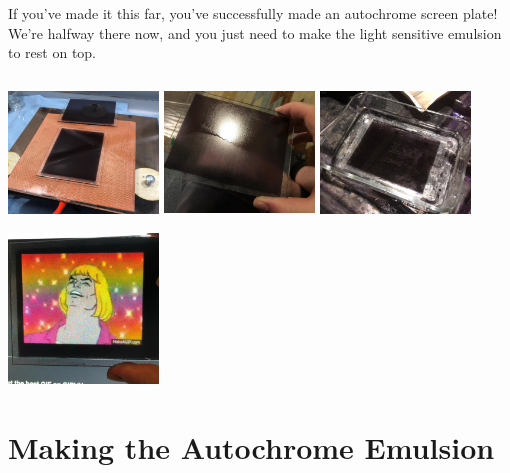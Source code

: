\documentclass[11pt]{article}
\begin{document}
If you've made it this far, you've successfully made an autochrome screen plate! We're halfway there now, and you just need to make the light sensitive emulsion to rest on top.\newline

\begin{center}
\includegraphics[width=4cm, height=4cm]{img/part1_41.jpg}
\includegraphics[width=4cm, height=4cm]{img/part1_42.jpg}
\includegraphics[width=4cm, height=4cm]{img/part1_43.jpg}
\includegraphics[width=4cm, height=4cm]{img/part1_44.jpg}
\end{center}

\pagebreak

\section{Making the Autochrome Emulsion}
\end{document}
